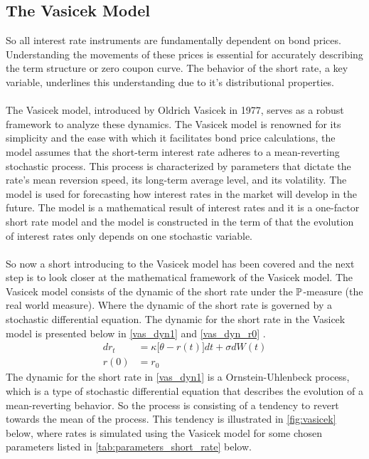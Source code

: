 \subsection{The Vasicek Model}
So all interest rate instruments are fundamentally dependent on bond prices. Understanding the movements of 
these prices is essential for accurately describing the term structure or zero coupon curve. The behavior 
of the short rate, a key variable, underlines this understanding due to it's distributional properties.
\\\\
The Vasicek model, introduced by Oldrich Vasicek in 1977, serves as a robust framework to analyze these dynamics.
The Vasicek model is renowned for its simplicity and the ease with which it facilitates bond price calculations, 
the model assumes that the short-term interest rate adheres to a mean-reverting stochastic process. This process is characterized 
by parameters that dictate the rate's mean reversion speed, its long-term average level, and its volatility.
The model is used for forecasting how interest rates in the market will develop in the future. The model is a
mathematical result of interest rates and it is a one-factor short rate model and the model is constructed in the 
term of that the evolution of interest rates only depends on one stochastic variable.
\\\\
So now a short introducing to the Vasicek model has been covered and the next step is to look closer at the 
mathematical framework of the Vasicek model. The Vasicek model consists of the dynamic of the short rate under the $\mathbb{P}$-measure
(the real world measure). Where the dynamic of the short rate is governed by a stochastic differential equation. 
The dynamic for the short rate in the Vasicek model is presented below in \autoref{vas_dyn1} and \autoref{vas_dyn_r0} \cite{Bjork}.
\begin{align}
    d r_t &= \kappa \Big[\theta -r(t)\Big] dt + \sigma d W(t) \label{vas_dyn1}\\
    r(0) &= r_0 \label{vas_dyn_r0}
\end{align}
The dynamic for the short rate in \autoref{vas_dyn1} is a Ornstein-Uhlenbeck process, which is a type of stochastic 
differential equation that describes the evolution of a mean-reverting behavior. So the process is consisting of a 
tendency to revert towards the mean of the process. This tendency is illustrated in \autoref{fig:vasicek} below, where 
 rates is simulated using the Vasicek model for some chosen parameters listed in \autoref{tab:parameters_short_rate} below. 
